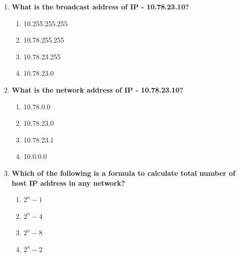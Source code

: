 \begin{flushleft}
\begin{enumerate}
		\item \textbf{What is the broadcast address of IP - 10.78.23.10?}
		\begin{enumerate}[label=(\alph*)]
			\item 10.255.255.255    %
			\item 10.78.255.255
			\item 10.78.23.255
			\item 10.78.23.0     
		\end{enumerate}
		\bigskip
		\bigskip		
		\newpage
		\item \textbf{What is the network address of IP - 10.78.23.10?}
		\begin{enumerate}[label=(\alph*)]
			\item 10.78.0.0
			\item 10.78.23.0
			\item 10.78.23.1     
			\item 10.0.0.0    %
		\end{enumerate}
		\bigskip
		\bigskip		

		\item \textbf{Which of the following is a formula to calculate total number of host IP address in any network?}
		\begin{enumerate}[label=(\alph*)]
			\item $2^n-1$
			\item $2^n-4$
			\item $2^n-8$
			\item $2^n-2$   %
		\end{enumerate}
		\bigskip
		\bigskip		

		
		
	\end{enumerate}
\end{flushleft}

\newpage

